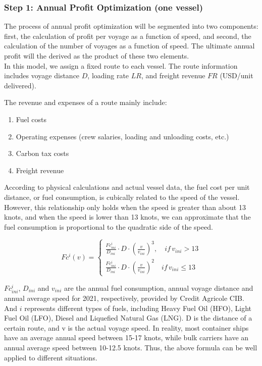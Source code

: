 \documentclass[a4paper,12pt]{article}
\begin{document}
\subsubsection*{Step 1: Annual Profit Optimization (one vessel)}

The process of annual profit optimization will be segmented into two components: first, the calculation of profit per voyage as a function of speed, and second, the calculation of the number of voyages as a function of speed.
The ultimate annual profit will the derived as the product of these two elements.\\

In this model, we assign a fixed route to each vessel. The route information includes voyage distance $D$, loading rate $LR$, and freight revenue $FR$ (USD/unit delivered).

The revenue and expenses of a route mainly include:
\begin{enumerate}
	\item Fuel costs
	\item Operating expenses (crew salaries, loading and unloading costs, etc.)
	\item Carbon tax costs
	\item Freight revenue
\end{enumerate}

According to physical calculations and actual vessel data, the fuel cost per unit distance, or fuel consumption, is cubically related to the speed of the vessel.
However, this relationship only holds when the speed is greater than about 13 knots, and when the speed is lower than 13 knots, we can approximate that the fuel consumption is proportional to the quadratic side of the speed.

\begin{equation}
	\label{eq:fuel_consumption}
	Fc^i(v) =
	\left\{
	\begin{aligned}
		\frac{Fc^i_{ini}}{D_{ini}} \cdot D \cdot (\frac{v}{v_{ini}})^3, \quad if \, v_{ini} > 13 \\
		\frac{Fc^i_{ini}}{D_{ini}} \cdot D \cdot (\frac{v}{v_{ini}})^2 \quad if \, v_{ini} \leq 13
	\end{aligned}
	\right.
\end{equation}

$Fc^i_{ini}$, $D_{ini}$ and $v_{ini}$ are the annual fuel consumption, annual voyage distance and annual average speed for 2021, respectively, provided by Credit Agricole CIB.
And $i$ represents different types of fuels, including Heavy Fuel Oil (HFO), Light Fuel Oil (LFO), Diesel and Liquefied Natural Gas (LNG). D is the distance of a certain route, and v is the actual voyage speed.
In reality, most container ships have an average annual speed between 15-17 knots, while bulk carriers have an annual average speed between 10-12.5 knots.
Thus, the above formula can be well applied to different situations.\\
\end{document}
